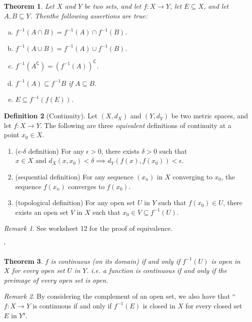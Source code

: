 \documentclass[12pt, lettersize]{book}
\theoremstyle{plain}
\newtheorem{thm}{Theorem}[section]
\theoremstyle{definition}
\newtheorem{dfn}[thm]{Definition}
\theoremstyle{remark}
\newtheorem*{rem}{Remark}
\newcommand{\com}{\mathsf{C}}
\begin{document}
		\begin{thm}
			Let $X$ and $Y$ be two sets, and let $f: X\rightarrow Y$, let $E\subseteq X$, and let $A,B\subseteq Y$. Thenthe following assertions are true:
			\begin{enumerate}[(a)]
				\item $f^{-1}(A\cap B)=f^{-1}(A)\cap f^{-1}(B)$.
				\item $f^{-1}(A\cup B)=f^{-1}(A)\cup f^{-1}(B)$.
				\item $f^{-1}(A^\com)=(f^{-1}(A))^\com$.
				\item $f^{-1}(A)\subseteq f^{-1}B$ if $A\subseteq B$.
				\item $E\subseteq f^{-1}(f(E))$.
			\end{enumerate}
		\end{thm}
		
		\begin{dfn}[Continuity]\label{def:continuity (Metrics)}
			Let $(X, d_X)$ and $(Y, d_Y)$ be two metric spaces, and let $f: X\rightarrow Y$. The following are three \emph{equivalent} definitions of continuity at a point $x_0\in X$.
			\begin{enumerate}
				\item ($\epsilon$-$\delta$ definition) For any $\epsilon>0$, there exists $\delta>0$ such that $x\in X\text{ and }d_X(x,x_0)<\delta\implies d_Y(f(x),f(x_0))<\epsilon$.
				\item (sequential definition) For any sequence $(x_n)$ in $X$ converging to $x_0$, the sequence $f(x_n)$ converges to $f(x_0)$.
				\item (topological definition) For any open set $U$ in $Y$ such that $f(x_0)\in U$, there exists an open set $V$ in $X$ such that $x_0\in V\subseteq f^{-1}(U)$.
			\end{enumerate}
		\end{dfn}
		\begin{rem}
			See worksheet 12 for the proof of equivalence.
		\end{rem}
		`	
		\begin{thm}\label{thm:preimage is open}
			$f$ is continuous (on its domain) if and only if $f^{-1}(U)$ is open in $X$ for every open set $U$ in $Y$. i.e. a function is continuous if and only if the preimage of every open set is open.
		\end{thm}
		\begin{rem}
		By considering the complement of an open set, we also have that ``$f:X\rightarrow Y$ is continuous if and only if $f^{-1}(E)$ is closed in $X$ for every closed set $E$ in $Y$".
		\end{rem}
		
\end{document}
